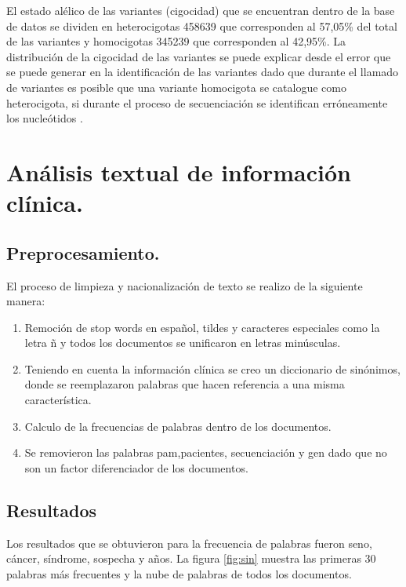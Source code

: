El estado alélico de las variantes (cigocidad) que se encuentran dentro de la base de datos se dividen en heterocigotas 458639 que corresponden al 57,05\% del total de las variantes  y homocigotas 345239 que corresponden al 42,95\%. La distribución de la cigocidad de las variantes se puede explicar desde el error que se puede generar en la identificación de las variantes dado que durante el llamado  de variantes es posible que una variante homocigota se catalogue como heterocigota, si durante el proceso de secuenciación se identifican erróneamente los nucleótidos \cite{Babraham2016}\cite{Pirooznia2014}. 


\section{Análisis textual de información clínica.}

 
\subsection{Preprocesamiento.}

El proceso de limpieza y nacionalización de texto se realizo de la siguiente manera:

 \begin{enumerate}
 	\item Remoción de stop words en español, tildes y caracteres especiales como  la letra ñ y todos los documentos se unificaron en letras minúsculas.
 	\item Teniendo en cuenta la información clínica se creo un diccionario de sinónimos, donde se reemplazaron palabras que hacen referencia a una misma característica.
 	\item Calculo de la frecuencias de palabras dentro de los documentos. 
 	\item Se removieron las palabras pam,pacientes, secuenciación y gen dado que no son un factor diferenciador de los documentos.  	  
 \end{enumerate}

\subsection*{Resultados}

Los resultados que se obtuvieron para la frecuencia de palabras fueron seno, cáncer, síndrome, sospecha y años. La figura \ref{fig:sin} muestra las primeras 30 palabras más frecuentes y la nube de palabras de todos los documentos.\\

